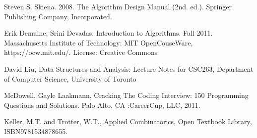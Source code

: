 \documentclass{article}
\begin{document}
    
    
    
    



\begin{thebibliography}{}
\bibitem{}
Steven S. Skiena. 2008. The Algorithm Design Manual (2nd. ed.). Springer Publishing Company, Incorporated.

\bibitem[]{}
Erik Demaine, Srini Devadas. Introduction to Algorithms. Fall 2011. Massachusetts Institute of Technology: MIT OpenCouseWare, https://ocw.mit.edu/. License: Creative Commons

\bibitem{}
David Liu, Data Structures and Analysis: Lecture Notes for CSC263, Department of Computer Science, University of Toronto

\bibitem{}
McDowell, Gayle Laakmann, Cracking The Coding Interview: 150 Programming Questions and Solutions. Palo Alto, CA :CareerCup, LLC, 2011.

\bibitem{}
Keller, M.T. and Trotter, W.T., Applied Combinatorics, Open Textbook Library, ISBN9781534878655.
\end{thebibliography}
\end{document}
